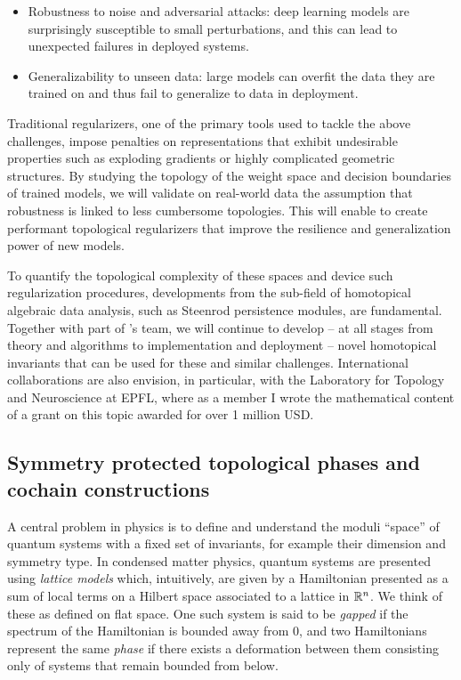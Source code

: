 \begin{itemize}
	\item Robustness to noise and adversarial attacks: deep learning models are surprisingly susceptible to small perturbations, and this can lead to unexpected failures in deployed systems.
	\item Generalizability to unseen data: large models can overfit the data they are trained on and thus fail to generalize to data in deployment.
\end{itemize}
Traditional regularizers, one of the primary tools used to tackle the above challenges, impose penalties on representations that exhibit undesirable properties such as exploding gradients or highly complicated geometric structures.
By studying the topology of the weight space and decision boundaries of trained models, we will validate on real-world data the assumption that robustness is linked to less cumbersome topologies.
This will enable to create performant topological regularizers that improve the resilience and generalization power of new models.

To quantify the topological complexity of these spaces and device such regularization procedures, developments from the sub-field of homotopical algebraic data analysis, such as Steenrod persistence modules, are fundamental.
Together with part of \giottoTDA's team, we will continue to develop -- at all stages from theory and algorithms to implementation and deployment -- novel homotopical invariants that can be used for these and similar challenges.
International collaborations are also envision, in particular, with the Laboratory for Topology and Neuroscience at EPFL, where as a member I wrote the mathematical content of a grant on this topic awarded for over 1 million USD.

\subsection{Symmetry protected topological phases and cochain constructions} \label{ss:spt phases}

A central problem in physics is to define and understand the moduli ``space'' of quantum systems with a fixed set of invariants, for example their dimension and symmetry type.
In condensed matter physics, quantum systems are presented using \textit{lattice models} which, intuitively, are given by a Hamiltonian presented as a sum of local terms on a Hilbert space associated to a lattice in $\mathbb{R}^n$.
We think of these as defined on flat space.
One such system is said to be \textit{gapped} if the spectrum of the Hamiltonian is bounded away from $0$, and two Hamiltonians represent the same \textit{phase} if there exists a deformation between them consisting only of systems that remain bounded from below.

